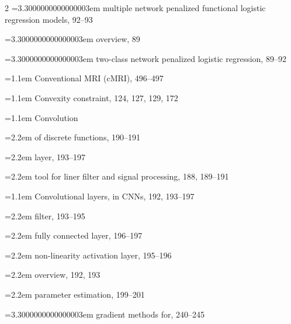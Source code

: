 \begin{multicols}{2}
\noindent\hangindent=3.3000000000000003em \hspace*{2.2em}multiple network penalized functional logistic regression models, 92--93\par
\noindent\hangindent=3.3000000000000003em \hspace*{2.2em}overview, 89\par
\noindent\hangindent=3.3000000000000003em \hspace*{2.2em}two-class network penalized logistic regression, 89--92\par
\noindent\hangindent=1.1em Conventional MRI (cMRI), 496--497\par
\noindent\hangindent=1.1em Convexity constraint, 124, 127, 129, 172\par
\noindent\hangindent=1.1em Convolution\par
\noindent\hangindent=2.2em \hspace*{1.1em}of discrete functions, 190--191\par
\noindent\hangindent=2.2em \hspace*{1.1em}layer, 193--197\par
\noindent\hangindent=2.2em \hspace*{1.1em}tool for liner filter and signal processing, 188, 189--191\par
\noindent\hangindent=1.1em Convolutional layers, in CNNs, 192, 193--197\par
\noindent\hangindent=2.2em \hspace*{1.1em}filter, 193--195\par
\noindent\hangindent=2.2em \hspace*{1.1em}fully connected layer, 196--197\par
\noindent\hangindent=2.2em \hspace*{1.1em}non-linearity activation layer, 195--196\par
\noindent\hangindent=2.2em \hspace*{1.1em}overview, 192, 193\par
\noindent\hangindent=2.2em \hspace*{1.1em}parameter estimation, 199--201\par
\noindent\hangindent=3.3000000000000003em \hspace*{2.2em}gradient methods for, 240--245\par

\end{multicols}
